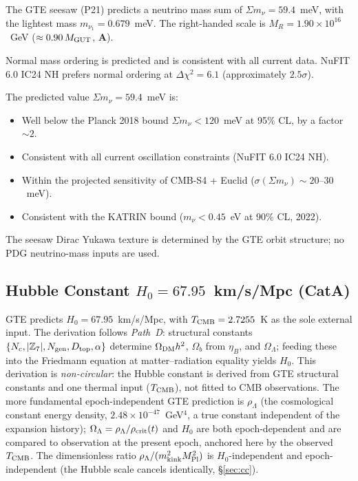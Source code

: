 \documentclass[11pt,openany]{book}
\theoremstyle{remark}
\newcommand{\ZS}{\mathbb{Z}_7}
\newcommand{\OmL}{\Omega_\Lambda}
\newcommand{\Ngen}{N_{\rm gen}}
\newcommand{\Nc}{N_c}
\newcommand{\CatA}{\textbf{A}}
\begin{document}
The GTE seesaw (P21) \cite{SpivackNeutrino} predicts a neutrino mass sum of $\Sigma m_\nu = 59.4$~meV,
with the lightest mass $m_{\nu_1} = 0.679$~meV.
The right-handed scale is $M_R = 1.90 \times 10^{16}$~GeV
($\approx 0.90\,M_{\rm GUT}$, \CatA).

Normal mass ordering is predicted and is consistent with all current data.
NuFIT 6.0 IC24 NH prefers normal ordering at $\Delta\chi^2 = 6.1$
(approximately $2.5\sigma$).

The predicted value $\Sigma m_\nu = 59.4$~meV is:
\begin{itemize}
\item Well below the Planck 2018 bound $\Sigma m_\nu < 120$~meV at 95\% CL,
  by a factor $\sim 2$.
\item Consistent with all current oscillation constraints (NuFIT 6.0 IC24 NH).
\item Within the projected sensitivity of CMB-S4 + Euclid
  ($\sigma(\Sigma m_\nu) \sim 20$--$30$~meV).
\item Consistent with the KATRIN bound ($m_\nu < 0.45$~eV at 90\% CL, 2022).
\end{itemize}
The seesaw Dirac Yukawa texture is determined by the GTE orbit structure; no
PDG neutrino-mass inputs are used.

\subsection*{Hubble Constant \texorpdfstring{$H_0 = 67.95$~km/s/Mpc}{H0 = 67.95 km/s/Mpc} (CatA)}

GTE predicts $H_0 = 67.95$~km/s/Mpc, with $T_{\rm CMB} = 2.7255$~K as the
sole external input.
The derivation follows \emph{Path~D}: structural constants
$\{\Nc, |\ZS|, \Ngen, D_{\rm top}, \alpha\}$ determine $\Omega_{\rm DM}h^2$,
$\Omega_b$ from $\eta_B$, and $\OmL$;
feeding these into the Friedmann equation at matter--radiation equality yields $H_0$.
This derivation is \emph{non-circular}: the Hubble constant is derived from GTE
structural constants and one thermal input ($T_{\rm CMB}$), not fitted to CMB
observations.
The more fundamental epoch-independent GTE prediction is $\rho_\Lambda$ (the
cosmological constant energy density, $2.48\times10^{-47}$~GeV$^4$, a true constant
independent of the expansion history); $\Omega_\Lambda = \rho_\Lambda/\rho_{\rm crit}(t)$
and $H_0$ are both epoch-dependent and are compared to observation at the present epoch,
anchored here by the observed $T_{\rm CMB}$.
The dimensionless ratio $\rho_\Lambda/(m_{\rm kink}^2 M_{\rm Pl}^2)$ is
$H_0$-independent and epoch-independent (the Hubble scale cancels identically,
\S\ref{sec:cc}).
\end{document}
